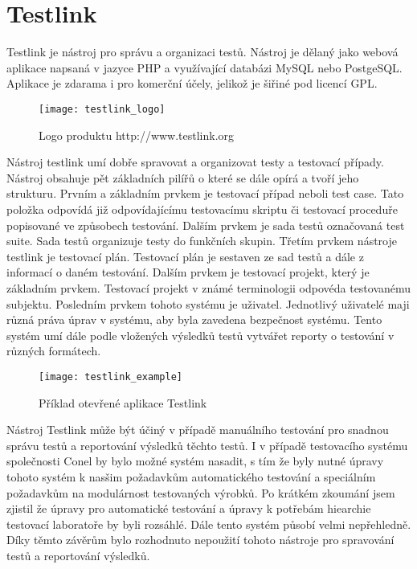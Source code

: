\section{Testlink}
Testlink je nástroj pro správu a organizaci testů. Nástroj je dělaný jako webová aplikace napsaná v jazyce PHP a využívající databázi MySQL nebo PostgeSQL. Aplikace je zdarama i pro komerční účely, jelikož je šiřiné pod licencí GPL.

\begin{figure}[h]
  \centering
  \texttt{[image: testlink\_logo]}
  \caption{Logo produktu http://www.testlink.org}
  \label{fig:testlink_logo}
\end{figure}

Nástroj testlink umí dobře spravovat a organizovat testy a testovací případy. Nástroj obsahuje pět základních pilířů o které se dále opírá a tvoří jeho strukturu. Prvním a základním prvkem je testovací případ neboli test case. Tato položka odpovídá již odpovídajícímu testovacímu skriptu či testovací proceduře popisované ve způsobech testování. Dalším prvkem je sada testů označovaná test suite. Sada testů organizuje testy do funkčních skupin. Třetím prvkem nástroje testlink je testovací plán. Testovací plán je sestaven ze sad testů a dále z informací o daném testování. Dalším prvkem je testovací projekt, který je základním prvkem. Testovací projekt v známé terminologii odpovéda testovanému subjektu. Posledním prvkem tohoto systému je uživatel. Jednotlivý uživatelé maji různá práva úprav v systému, aby byla zavedena bezpečnost systému. Tento systém umí dále podle vložených výsledků testů vytvářet reporty o testování v různých formátech.

\begin{figure}[h]
  \centering
  \texttt{[image: testlink\_example]}
  \caption{Příklad otevřené aplikace Testlink}
  \label{fig:testlink_example}
\end{figure}

Nástroj Testlink může být účiný v případě manuálního testování pro snadnou správu testů a reportování výsledků těchto testů. I v případě testovacího systému společnosti Conel by bylo možné systém nasadit, s tím že byly nutné úpravy tohoto systém k nasšim požadavkům automatického testování a speciálním požadavkům na modulárnost testovaných výrobků. Po krátkém zkoumání jsem zjistil že úpravy pro automatické testování a úpravy k potřebám hiearchie testovací laboratoře by byli rozsáhlé. Dále tento systém působí velmi nepřehledně. Díky těmto závěrům bylo rozhodnuto nepoužití tohoto nástroje pro spravování testů a reportování výsledků.


